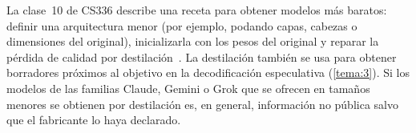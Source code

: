 \begin{observacion}
La clase~10 de CS336 describe una receta para obtener modelos más baratos: definir una arquitectura menor (por ejemplo, podando capas, cabezas o dimensiones del original), inicializarla con los pesos del original y reparar la pérdida de calidad por destilación~\cite{cs336}. La destilación también se usa para obtener borradores próximos al objetivo en la decodificación especulativa (\cref{tema:3}). Si los modelos de las familias Claude, Gemini o Grok que se ofrecen en tamaños menores se obtienen por destilación es, en general, información no pública salvo que el fabricante lo haya declarado.
\end{observacion}

